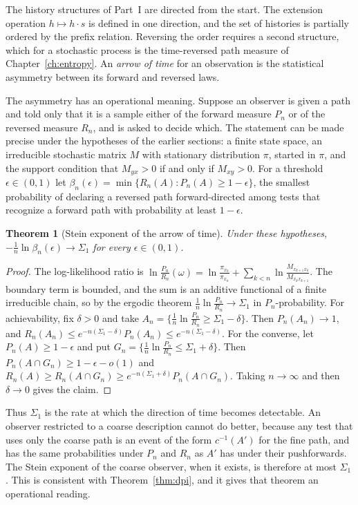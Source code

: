\documentclass[11pt,oneside]{book}
\newtheorem{theorem}{Theorem}[chapter]
\theoremstyle{definition}
\theoremstyle{remark}
\begin{document}
The history structures of Part~I are directed from the start. The extension operation $h\mapsto h\cdot s$ is defined in one direction, and the set of histories is partially ordered by the prefix relation. Reversing the order requires a second structure, which for a stochastic process is the time-reversed path measure of Chapter~\ref{ch:entropy}. An \emph{arrow of time} for an observation is the statistical asymmetry between its forward and reversed laws.

The asymmetry has an operational meaning. Suppose an observer is given a path and told only that it is a sample either of the forward measure $P_n$ or of the reversed measure $R_n$, and is asked to decide which. The statement can be made precise under the hypotheses of the earlier sections: a finite state space, an irreducible stochastic matrix $M$ with stationary distribution $\pi$, started in $\pi$, and the support condition that $M_{yx}>0$ if and only if $M_{xy}>0$. For a threshold $\epsilon\in(0,1)$ let $\beta_n(\epsilon)=\min\{R_n(A):P_n(A)\geq1-\epsilon\}$, the smallest probability of declaring a reversed path forward-directed among tests that recognize a forward path with probability at least $1-\epsilon$.

\begin{theorem}[Stein exponent of the arrow of time]\label{thm:stein}
Under these hypotheses, $-\tfrac1n\ln\beta_n(\epsilon)\to\Sigma_1$ for every $\epsilon\in(0,1)$.
\end{theorem}

\begin{proof}
The log-likelihood ratio is $\ln\frac{P_n}{R_n}(\omega)=\ln\frac{\pi_{x_0}}{\pi_{x_n}}+\sum_{k<n}\ln\frac{M_{x_{k+1}x_k}}{M_{x_kx_{k+1}}}$. The boundary term is bounded, and the sum is an additive functional of a finite irreducible chain, so by the ergodic theorem $\tfrac1n\ln\frac{P_n}{R_n}\to\Sigma_1$ in $P_n$-probability. For achievability, fix $\delta>0$ and take $A_n=\{\tfrac1n\ln\frac{P_n}{R_n}\geq\Sigma_1-\delta\}$. Then $P_n(A_n)\to1$, and $R_n(A_n)\leq e^{-n(\Sigma_1-\delta)}P_n(A_n)\leq e^{-n(\Sigma_1-\delta)}$. For the converse, let $P_n(A)\geq1-\epsilon$ and put $G_n=\{\tfrac1n\ln\frac{P_n}{R_n}\leq\Sigma_1+\delta\}$. Then $P_n(A\cap G_n)\geq1-\epsilon-o(1)$ and $R_n(A)\geq R_n(A\cap G_n)\geq e^{-n(\Sigma_1+\delta)}P_n(A\cap G_n)$. Taking $n\to\infty$ and then $\delta\to0$ gives the claim.
\end{proof}

Thus $\Sigma_1$ is the rate at which the direction of time becomes detectable. An observer restricted to a coarse description cannot do better, because any test that uses only the coarse path is an event of the form $c^{-1}(A')$ for the fine path, and has the same probabilities under $P_n$ and $R_n$ as $A'$ has under their pushforwards. The Stein exponent of the coarse observer, when it exists, is therefore at most $\Sigma_1$. This is consistent with Theorem~\ref{thm:dpi}, and it gives that theorem an operational reading.
\end{document}
